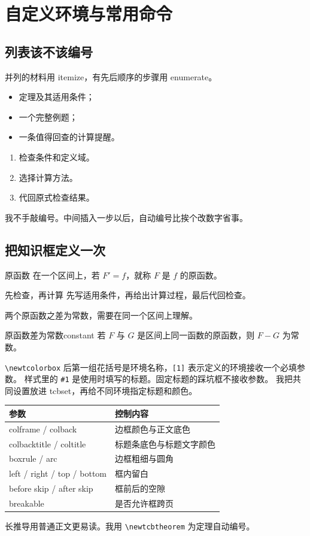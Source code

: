 \chapter{自定义环境与常用命令}

\section{列表该不该编号}
并列的材料用 itemize，有先后顺序的步骤用 enumerate。
\begin{itemize}
  \item 定理及其适用条件；
  \item 一个完整例题；
  \item 一条值得回查的计算提醒。
\end{itemize}
\begin{enumerate}[label=\arabic*.,leftmargin=*]
  \item 检查条件和定义域。
  \item 选择计算方法。
  \item 代回原式检查结果。
\end{enumerate}
我不手敲编号。中间插入一步以后，自动编号比挨个改数字省事。

\section{把知识框定义一次}
\begin{conceptbox}{原函数}
在一个区间上，若 \(F'=f\)，就称 \(F\) 是 \(f\) 的原函数。
\end{conceptbox}
\begin{methodbox}{先检查，再计算}
先写适用条件，再给出计算过程，最后代回检查。
\end{methodbox}
\begin{pitfallbox}
两个原函数之差为常数，需要在同一个区间上理解。
\end{pitfallbox}
\begin{notetheorem}{原函数差为常数}{constant}
若 \(F\) 与 \(G\) 是区间上同一函数的原函数，则 \(F-G\) 为常数。
\end{notetheorem}

\verb|\newtcolorbox| 后第一组花括号是环境名称，\verb|[1]| 表示定义的环境接收一个必填参数。
样式里的 \verb|#1| 是使用时填写的标题。固定标题的踩坑框不接收参数。
我把共同设置放进 tcbset，再给不同环境指定标题和颜色。
\begin{center}
\begin{tabular}{ll}
\toprule
参数 & 控制内容 \\
\midrule
colframe / colback & 边框颜色与正文底色 \\
colbacktitle / coltitle & 标题条底色与标题文字颜色 \\
boxrule / arc & 边框粗细与圆角 \\
left / right / top / bottom & 框内留白 \\
before skip / after skip & 框前后的空隙 \\
breakable & 是否允许框跨页 \\
\bottomrule
\end{tabular}
\end{center}
长推导用普通正文更易读。我用 \verb|\newtcbtheorem| 为定理自动编号。

